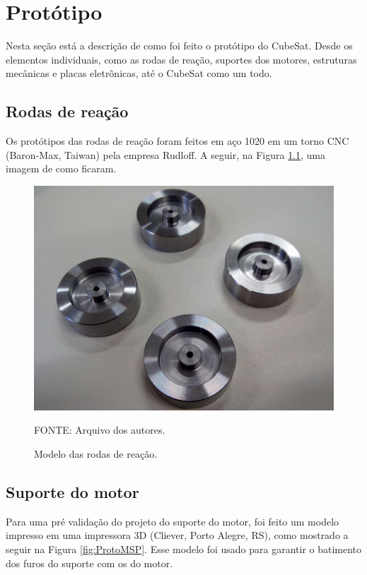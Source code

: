 \documentclass[
	12pt,				%
	openany,			%
	twoside,			%
	a4paper,			%
	english,			%
	french,				%
	spanish,			%
	brazil,				%
	oldfontcommands
	]{abntex2}
\begin{document}
\chapter{Protótipo}

Nesta seção está a descrição de como foi feito o protótipo do CubeSat. Desde os elementos individuais, como as rodas de reação, suportes dos motores, estruturas mecânicas e placas eletrônicas, até o CubeSat como um todo.

\section{Rodas de reação}

Os protótipos das rodas de reação foram feitos em aço 1020 em um torno CNC (Baron-Max, Taiwan) pela empresa Rudloff. A seguir, na Figura \ref{fig:ProtoRW}, uma imagem de como ficaram.

\begin{figure}[th]
	\caption{Modelo das rodas de reação.}
	\centering
	\includegraphics[width=0.7\linewidth]{./figs/Proto_RW}
	
	\begin{small}
		FONTE: Arquivo dos autores.
	\end{small}
	\label{fig:ProtoRW}
\end{figure}

\section{Suporte do motor}

Para uma pré validação do projeto do suporte do motor, foi feito um modelo impresso em uma impressora 3D (Cliever, Porto Alegre, RS), como mostrado a seguir na Figura \ref{fig:ProtoMSP}. Esse modelo foi usado para garantir o batimento dos furos do suporte com os do motor.
\end{document}
